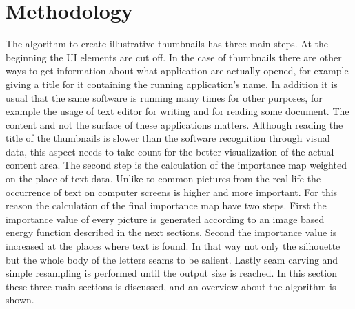 \documentclass[draft,final]{vutinfth} %
\begin{document}
	\chapter{Methodology}
	The algorithm to create illustrative thumbnails has three main steps.
	At the beginning the UI elements are cut off.
	In the case of thumbnails there are other ways to get information about what application are actually opened, for example giving a title for it containing the running application's name.
	In addition it is usual that the same software is running many times for other purposes, for example the usage of text editor for writing and for reading some document.
	The content and not the surface of these applications matters.
	Although reading the title of the thumbnails is slower than the software recognition through visual data, this aspect needs to take count for the better visualization of the actual content area.%
	The second step is the calculation of the importance map weighted on the place of text data.
	Unlike to common pictures from the real life the occurrence of text on computer screens is higher and more important.
	For this reason the calculation of the final importance map have two steps.
	First the importance value of every picture is generated according to an image based energy function described in the next sections.
	Second the importance value is increased at the places where text is found.
	In that way not only the silhouette but the whole body of the letters seams to be salient.
	Lastly seam carving and simple resampling is performed  until the output size is reached.
	In this section these three main sections is discussed, and an overview about the algorithm is shown.
	
\end{document}
